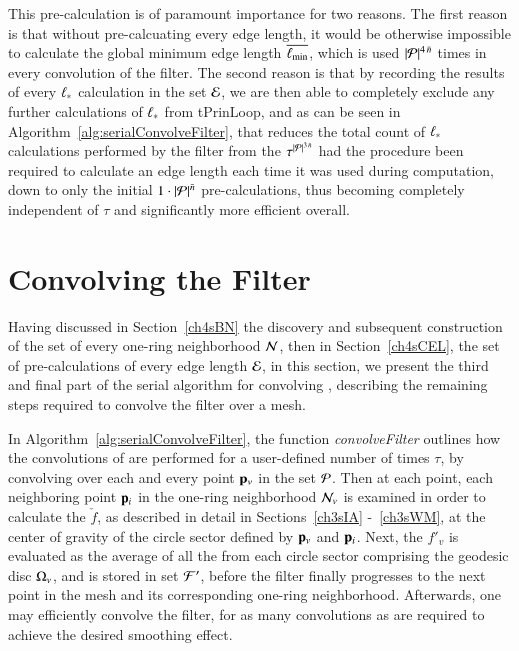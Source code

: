 This pre-calculation is of paramount importance for two reasons. The first reason is that without pre-calcuating every edge length, it would be otherwise impossible to calculate the global minimum edge length $\overline{\ell_\text{min}}$, which is used $|\mathcal{P}|^{4\,\bar{n}}$ times in every convolution of the filter. The second reason is that by recording the results of every $\ell_\ast$ calculation in the set $\mathcal{E}$, we are then able to completely exclude any further calculations of $\ell_\ast$ from \gls{tPrinLoop}, and as can be seen in Algorithm~\ref{alg:serialConvolveFilter}, that reduces the total count of $\ell_\ast$ calculations performed by the filter from the $\tau^{|\mathcal{P}|^{3\,\bar{n}}}$ had the procedure been required to calculate an edge length each time it was used during computation, down to only the initial $1\cdot |\mathcal{P}|^{\bar{n}}$ pre-calculations, thus becoming completely independent of $\tau$ and significantly more efficient overall.%
%

%
%
%
%
\section{Convolving the Filter}
\label{ch4sCF}
Having discussed in Section~\ref{ch4sBN} the discovery and subsequent construction of the set of every one-ring neighborhood $\mathcal{N}$, then in Section~\ref{ch4sCEL}, the set of pre-calculations of every edge length $\mathcal{E}$, in this section, we present the third and final part of the serial algorithm for convolving , describing the remaining steps required to convolve the filter over a mesh.

In Algorithm~\ref{alg:serialConvolveFilter}, the function \textit{convolveFilter} outlines how the convolutions of  are performed for a user-defined number of times $\tau$, by convolving over each and every point $\mathbf{p}_v$ in the set $\mathcal{P}$. Then at each point, each neighboring point $\mathbf{p}_i$ in the one-ring neighborhood $\mathcal{N}_v$ is examined in order to calculate the \wmfv{} $\check{f}$, as described in detail in Sections~\ref{ch3sIA} -~\ref{ch3sWM}, at the center of gravity of the circle sector defined by $\mathbf{p}_v$ and $\mathbf{p}_i$. Next, the \wmfv{} $f'_v$ is evaluated as the average of all the  from each circle sector comprising the geodesic disc $\Omega_v$, and is stored  in set $\mathcal{F}'$, before the filter finally progresses to the next point in the mesh and its corresponding one-ring neighborhood.  Afterwards, one may efficiently convolve the filter, for as many convolutions as are required to achieve the desired smoothing effect.

